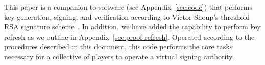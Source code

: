 This paper is a companion to software (see Appendix~\ref{sec:code})
that performs key generation, signing, and verification according to
Victor Shoup's threshold RSA signature scheme~\cite{shoup-sig}. In
addition, we have added the capability to perform key refresh
as we outline in Appendix~\ref{sec:proof-refresh}. Operated according to
the procedures described in this document, this code performs the core
tasks necessary for a collective of players to operate a virtual
signing authority.
